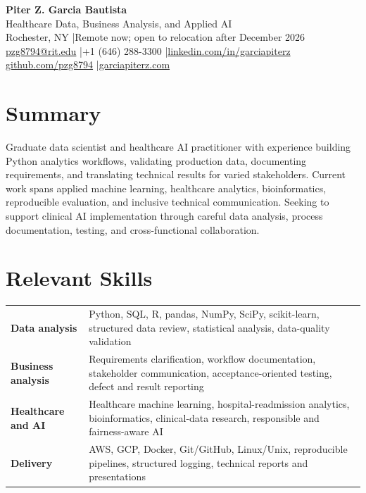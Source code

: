 \documentclass[10pt,letterpaper]{article}
\begin{document}
\fontsize{9}{10.4}\selectfont

\begin{center}
  {\Large\bfseries Piter Z. Garcia Bautista}\\[1pt]
  {\large Healthcare Data, Business Analysis, and Applied AI}\\[2pt]
  Rochester, NY \enspace|\enspace Remote now; open to relocation after December 2026\\
  \href{mailto:pzg8794@rit.edu}{pzg8794@rit.edu}
  \enspace|\enspace +1 (646) 288-3300
  \enspace|\enspace \href{https://linkedin.com/in/garciapiterz}{linkedin.com/in/garciapiterz}\\
  \href{https://github.com/pzg8794}{github.com/pzg8794}
  \enspace|\enspace \href{https://garciapiterz.com}{garciapiterz.com}
\end{center}

\section*{Summary}
Graduate data scientist and healthcare AI practitioner with experience
building Python analytics workflows, validating production data, documenting
requirements, and translating technical results for varied stakeholders.
Current work spans applied machine learning, healthcare analytics,
bioinformatics, reproducible evaluation, and inclusive technical
communication. Seeking to support clinical AI implementation through careful
data analysis, process documentation, testing, and cross-functional
collaboration.

\section*{Relevant Skills}
\begin{tabularx}{\textwidth}{@{}>{\bfseries}l X@{}}
Data analysis & Python, SQL, R, pandas, NumPy, SciPy, scikit-learn, structured data review, statistical analysis, data-quality validation\\
Business analysis & Requirements clarification, workflow documentation, stakeholder communication, acceptance-oriented testing, defect and result reporting\\
Healthcare and AI & Healthcare machine learning, hospital-readmission analytics, bioinformatics, clinical-data research, responsible and fairness-aware AI\\
Delivery & AWS, GCP, Docker, Git/GitHub, Linux/Unix, reproducible pipelines, structured logging, technical reports and presentations\\
\end{tabularx}
\end{document}
